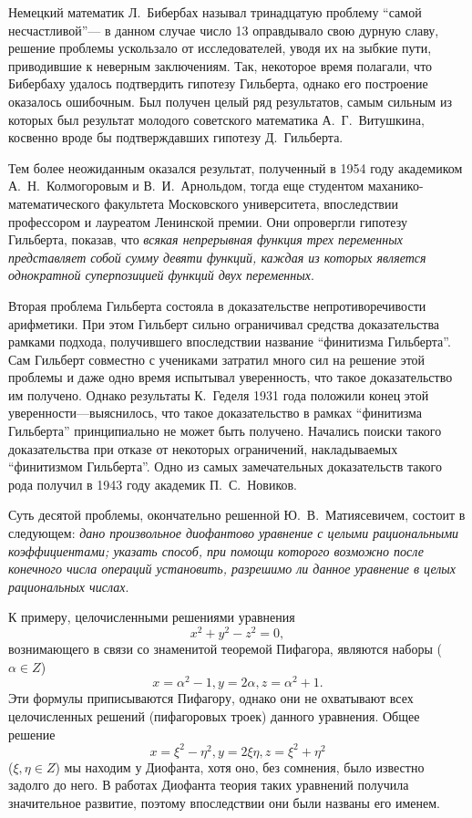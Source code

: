 \documentclass[twocolumn,10pt]{article}
\begin{document}
Немецкий математик Л.~Бибербах называл тринадцатую проблему ``самой несчастливой''--- в данном случае число 13 оправдывало свою дурную славу, решение проблемы ускользало от исследователей, уводя их на зыбкие пути, приводившие к неверным заключениям. Так, некоторое время полагали, что Бибербаху удалось подтвердить гипотезу Гильберта, однако его построение оказалось ошибочным. Был получен целый ряд результатов, самым сильным из которых был результат молодого советского математика А.~Г.~Витушкина, косвенно вроде бы подтверждавших гипотезу Д.~Гильберта.

Тем более неожиданным оказался результат, полученный в 1954 году академиком А.~Н.~Колмогоровым и В.~И.~Арнольдом, тогда еще студентом маханико-математического факультета Московского университета, впоследствии профессором и лауреатом Ленинской премии. Они опровергли гипотезу Гильберта, показав, что \emph{всякая непрерывная функция трех переменных представляет собой сумму девяти функций, каждая из которых является однократной суперпозицией функций двух переменных}.

Вторая проблема Гильберта состояла в доказательстве непротиворечивости арифметики. При этом Гильберт сильно ограничивал средства доказательства рамками подхода, получившего впоследствии название ``финитизма Гильберта''. Сам Гильберт совместно с учениками затратил много сил на решение этой проблемы и даже одно время испытывал уверенность, что такое доказательство им получено. Однако результаты К.~Геделя 1931 года положили конец этой уверенности---выяснилось, что такое доказательство в рамках ``финитизма Гильберта'' принципиально не может быть получено. Начались поиски такого доказательства при отказе от некоторых ограничений, накладываемых ``финитизмом Гильберта''. Одно из самых замечательных доказательств такого рода получил в 1943 году академик П.~С.~Новиков.

Суть десятой проблемы, окончательно решенной Ю.~В.~Матиясевичем, состоит в следующем: \emph{дано произвольное диофантово уравнение с целыми рациональными коэффициентами; указать способ, при помощи которого возможно после конечного числа операций установить, разрешимо ли данное уравнение в целых рациональных числах}.

К примеру, целочисленными решениями уравнения
$$
  x^2+y^2-z^2=0,
$$
вознимающего в связи со знаменитой теоремой Пифагора, являются наборы ($\alpha \in Z$)
$$
  x=\alpha^2-1, y=2\alpha, z=\alpha^2+1.
$$
Эти формулы приписываются Пифагору, однако они не охватывают всех целочисленных решений (пифагоровых троек) данного уравнения. Общее решение
$$
  x=\xi^{2}-\eta^{2}, y=2\xi \eta, z=\xi^2+\eta^2
$$
($\xi,\eta\in Z$) мы находим у Диофанта, хотя оно, без сомнения, было известно задолго до него. В работах Диофанта теория таких уравнений получила значительное развитие, поэтому впоследствии они были названы его именем.
\end{document}
